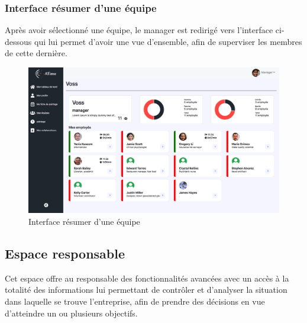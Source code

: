             \subsubsection*{Interface résumer d'une équipe}
            Après avoir sélectionné une équipe, le manager est redirigé vers l'interface ci-dessous qui lui permet d'avoir une vue d'ensemble, afin de superviser les membres de cette dernière.
                \begin{figure}[h!]
                             \centering
                                \includegraphics[scale=0.35 ]{images/interface/team_view.png}
                             \caption{Interface résumer d'une équipe}
                             \label{fig97}
                \end{figure}
        \subsection{Espace responsable}
            Cet espace offre au responsable des fonctionnalités avancées avec un accès à la totalité des informations lui permettant de contrôler et d’analyser la situation dans laquelle se trouve l’entreprise, afin de prendre des décisions en vue d’atteindre un ou plusieurs objectifs.
        
